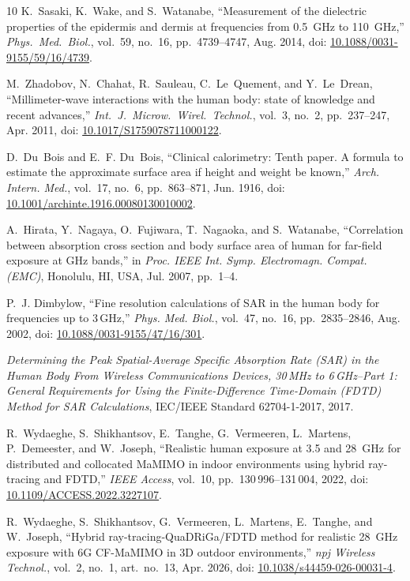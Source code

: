 \documentclass[journal,twocolumn,10pt]{IEEEtran}
\newcommand*{\doi}[1]{\href{https://doi.org/#1}{#1}}
\begin{document}
\begin{thebibliography}{10}
K.~Sasaki, K.~Wake, and S.~Watanabe, ``Measurement of the dielectric
  properties of the epidermis and dermis at frequencies from 0.5~GHz
  to 110~GHz,'' \emph{Phys.\ Med.\ Biol.}, vol.~59, no.~16,
  pp.~4739--4747, Aug. 2014,
  doi: \doi{10.1088/0031-9155/59/16/4739}.

M.~Zhadobov, N.~Chahat, R.~Sauleau, C.~Le~Quement, and Y.~Le~Drean,
  ``Millimeter-wave interactions with the human body: state of
  knowledge and recent advances,'' \emph{Int.\ J.\ Microw.\ Wirel.\
  Technol.}, vol.~3, no.~2, pp.~237--247, Apr. 2011,
  doi: \doi{10.1017/S1759078711000122}.

D.~Du~Bois and E.~F. Du~Bois, ``Clinical calorimetry: Tenth paper.
  A formula to estimate the approximate surface area if height and
  weight be known,'' \emph{Arch. Intern. Med.}, vol.~17, no.~6,
  pp.~863--871, Jun. 1916,
  doi: \doi{10.1001/archinte.1916.00080130010002}.

A.~Hirata, Y.~Nagaya, O.~Fujiwara, T.~Nagaoka, and S.~Watanabe,
  ``Correlation between absorption cross section and body surface area
  of human for far-field exposure at GHz bands,'' in \emph{Proc. IEEE
  Int. Symp. Electromagn. Compat. (EMC)}, Honolulu, HI, USA, Jul. 2007,
  pp.~1--4.

P.~J. Dimbylow, ``Fine resolution calculations of SAR in the human body
  for frequencies up to 3\,GHz,'' \emph{Phys. Med. Biol.}, vol.~47,
  no.~16, pp.~2835--2846, Aug. 2002,
  doi: \doi{10.1088/0031-9155/47/16/301}.

\emph{Determining the Peak Spatial-Average Specific Absorption Rate
  (SAR) in the Human Body From Wireless Communications Devices, 30\,MHz
  to 6\,GHz--Part 1: General Requirements for Using the
  Finite-Difference Time-Domain (FDTD) Method for SAR Calculations},
  IEC/IEEE Standard 62704-1-2017, 2017.

R.~Wydaeghe, S.~Shikhantsov, E.~Tanghe, G.~Vermeeren, L.~Martens,
  P.~Demeester, and W.~Joseph, ``Realistic human exposure at
  3.5 and 28~GHz for distributed and collocated MaMIMO in indoor
  environments using hybrid ray-tracing and FDTD,'' \emph{IEEE
  Access}, vol.~10, pp.~130\,996--131\,004, 2022, doi:
  \doi{10.1109/ACCESS.2022.3227107}.

R.~Wydaeghe, S.~Shikhantsov, G.~Vermeeren, L.~Martens, E.~Tanghe,
  and W.~Joseph, ``Hybrid ray-tracing-QuaDRiGa/FDTD method for
  realistic 28~GHz exposure with 6G CF-MaMIMO in 3D outdoor
  environments,'' \emph{npj Wireless Technol.}, vol.~2, no.~1,
  art.~no.~13, Apr. 2026, doi: \doi{10.1038/s44459-026-00031-4}.


\end{thebibliography}
\end{document}
